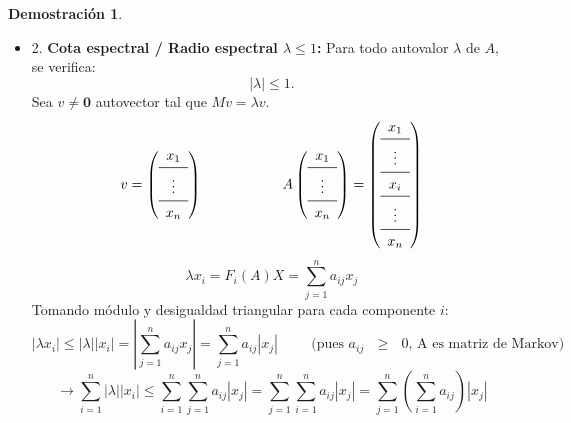 \documentclass[11pt,a4paper]{article}
\theoremstyle{definition}
\newtheorem{demostracion}{Demostración}
\begin{document}
\begin{demostracion}
\begin{itemize}
        \item 2. \textbf{Cota espectral / Radio espectral $\lambda \le 1$:} Para todo autovalor $\lambda$ de $A$, se verifica:
            \[
                |\lambda| \le 1.
            \]
            Sea $v \neq \mathbf{0}$ autovector tal que $Mv = \lambda v$. 
            \[
                v = \left( \begin{array}{c}
                        x_1 \\
                        \midrule
                        \vdots \\
                        \midrule
                        x_n
                \end{array}
                \right)
                \hspace*{2cm}
                A \left( \begin{array}{c}
                        x_1 \\
                        \midrule
                        \vdots \\
                        \midrule
                        x_n
                \end{array}
                \right)
                = 
                \left( \begin{array}{c}
                        x_1 \\
                        \midrule
                        \vdots \\
                        \midrule
                        x_i \\
                        \midrule
                        \vdots \\
                        \midrule
                        x_n
                \end{array}
                \right)
            \]
            \[
                \lambda x_i = F_i(A) X = \sum_{j=1}^{n} a_{ij} x_j
            \]
            Tomando módulo y desigualdad triangular para cada componente $i$:
            \[
                |\lambda x_i| \leq |\lambda| |x_i| = |\sum_{j=1}^{n} a_{ij} x_j| = \sum_{j=1}^{n} a_{ij} |x_j| \hspace{1cm} \text{(pues $a_{ij}$ $\geq$ $0$, A es matriz de Markov)}
            \]
            \[
                \rightarrow 
                    \sum_{i=1}^{n} |\lambda||x_i| 
                \leq 
                    \sum_{i=1}^{n} \sum_{j=1}^{n} a_{ij} |x_j| 
                = 
                    \sum_{j=1}^{n} \sum_{i=1}^{n} a_{ij} |x_j| 
                = 
                    \sum_{j=1}^{n} \left( \sum_{i=1}^{n} a_{ij} \right) |x_j|  
\]
\end{itemize}
\end{demostracion}
\end{document}
